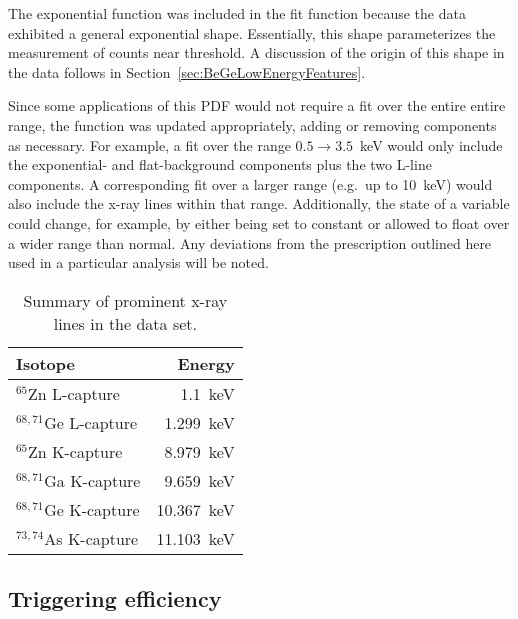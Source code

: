 The exponential function was included in the fit function because the data exhibited a general exponential shape.  Essentially, this shape parameterizes the measurement of counts near threshold.  A discussion of the origin of this shape in the data follows in Section~\ref{sec:BeGeLowEnergyFeatures}.  

Since some applications of this PDF would not require a fit over the entire entire range, the function was updated appropriately, adding or removing components as necessary.  For example, a fit over the range $0.5\to3.5$~keV would only include the exponential- and flat-background components plus the two L-line components.  A corresponding fit over a larger range (e.g.~up to 10~keV) would also include the x-ray lines within that range.  Additionally, the state of a variable could change, for example, by either being set to constant or allowed to float over a wider range than normal.  Any deviations from the prescription outlined here used in a particular analysis will be noted.  

			\begin{table}
			\centering
				\begin{tabular}{l r}
					\toprule
					Isotope & Energy \\
					\midrule
					$^{65}$Zn L-capture & 1.1~keV \\
					$^{68,71}$Ge L-capture & 1.299~keV \\
					$^{65}$Zn K-capture & 8.979~keV \\
					$^{68,71}$Ga K-capture & 9.659~keV \\
					$^{68,71}$Ge K-capture & 10.367~keV \\
					$^{73,74}$As K-capture & 11.103~keV \\
					\bottomrule
				\end{tabular}	
				\caption[Summary of prominent x-ray lines in the \bege~data set]
				{Summary of prominent x-ray lines in the data set.}
				\label{tab:XRayLines}
			\end{table}	
	
		\subsection{Triggering efficiency}
		\label{sec:BeGeTrigEff}

